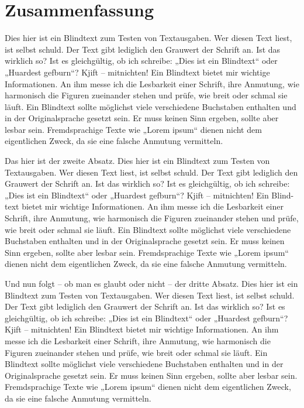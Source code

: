 \documentclass[class=scrbook, crop=false]{standalone}
\begin{document}
\chapter*{Zusammenfassung}
\label{Chapter::Zusammenfassung}
{
    \setlength{\parindent}{0em}
    \setlength{\parskip}{1.0em}

    Dies hier ist ein Blindtext zum Testen von Textausgaben. Wer diesen Text liest, ist selbst schuld. Der Text gibt lediglich den Grauwert der Schrift an. Ist das wirklich so? Ist es gleichgültig, ob ich schreibe: „Dies ist ein Blindtext“ oder „Huardest gefburn“? Kjift – mitnichten! Ein Blindtext bietet mir wichtige Informationen. An ihm messe ich die Lesbarkeit einer Schrift, ihre Anmutung, wie harmonisch die Figuren zueinander stehen und prüfe, wie breit oder schmal sie läuft. Ein Blindtext sollte möglichst viele verschiedene Buchstaben enthalten und in der Originalsprache gesetzt sein. Er muss keinen Sinn ergeben, sollte aber lesbar sein. Fremdsprachige Texte wie „Lorem ipsum“ dienen nicht dem eigentlichen Zweck, da sie eine falsche Anmutung vermitteln.

    Das hier ist der zweite Absatz. Dies hier ist ein Blindtext zum Testen von Textausgaben. Wer diesen Text liest, ist selbst schuld. Der Text gibt lediglich den Grauwert der Schrift an. Ist das wirklich so? Ist es gleichgültig, ob ich schreibe: „Dies ist ein Blindtext“ oder „Huardest gefburn“? Kjift – mitnichten! Ein Blind-text bietet mir wichtige Informationen. An ihm messe ich die Lesbarkeit einer Schrift, ihre Anmutung, wie harmonisch die Figuren zueinander stehen und prüfe, wie breit oder schmal sie läuft. Ein Blindtext sollte möglichst viele verschiedene Buchstaben enthalten und in der Originalsprache gesetzt sein. Er muss keinen Sinn ergeben, sollte aber lesbar sein. Fremdsprachige Texte wie „Lorem ipsum“ dienen nicht dem eigentlichen Zweck, da sie eine falsche Anmutung vermitteln.

    Und nun folgt – ob man es glaubt oder nicht – der dritte Absatz. Dies hier ist ein Blindtext zum Testen von Textausgaben. Wer diesen Text liest, ist selbst schuld. Der Text gibt lediglich den Grauwert der Schrift an. Ist das wirklich so? Ist es gleichgültig, ob ich schreibe: „Dies ist ein Blindtext“ oder „Huardest gefburn“? Kjift – mitnichten! Ein Blindtext bietet mir wichtige Informationen. An ihm messe ich die Lesbarkeit einer Schrift, ihre Anmutung, wie harmonisch die Figuren zueinander stehen und prüfe, wie breit oder schmal sie läuft. Ein Blindtext sollte möglichst viele verschiedene Buchstaben enthalten und in der Originalsprache gesetzt sein. Er muss keinen Sinn ergeben, sollte aber lesbar sein. Fremdsprachige Texte wie „Lorem ipsum“ dienen nicht dem eigentlichen Zweck, da sie eine falsche Anmutung vermitteln.

}
\end{document}
